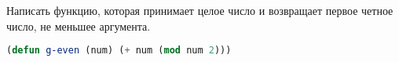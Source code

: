 Написать функцию, которая принимает целое число и возвращает первое четное
число, не меньшее аргумента.

\begin{lstlisting}[language=Lisp]
(defun g-even (num) (+ num (mod num 2)))
\end{lstlisting}


